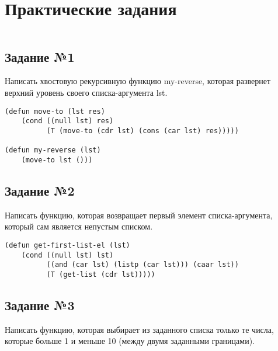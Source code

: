 \chapter{Практические задания}

\vspace{4mm}
\hfill
\begin{minipage}{0.92\linewidth}
\begin{lstlisting}
\end{lstlisting}
\end{minipage}

\section{Задание №1}

Написать хвостовую рекурсивную функцию my-reverse, которая развернет верхний
уровень своего списка-аргумента lst.

\vspace{4mm}
\hfill
\begin{minipage}{0.92\linewidth}
\begin{lstlisting}
(defun move-to (lst res)
    (cond ((null lst) res)
          (T (move-to (cdr lst) (cons (car lst) res)))))

(defun my-reverse (lst)
    (move-to lst ()))
\end{lstlisting}
\end{minipage}

\section{Задание №2}

Написать функцию, которая возвращает первый элемент списка-аргумента, который
сам является непустым списком.

\vspace{4mm}
\begin{minipage}{0.92\linewidth}
\begin{lstlisting}
(defun get-first-list-el (lst)
    (cond ((null lst) lst)
          ((and (car lst) (listp (car lst))) (caar lst))
          (T (get-list (cdr lst)))))
\end{lstlisting}
\end{minipage}

\section{Задание №3}

Написать функцию, которая выбирает из заданного списка только те числа,
которые больше 1 и меньше 10 (между двумя заданными границами).

